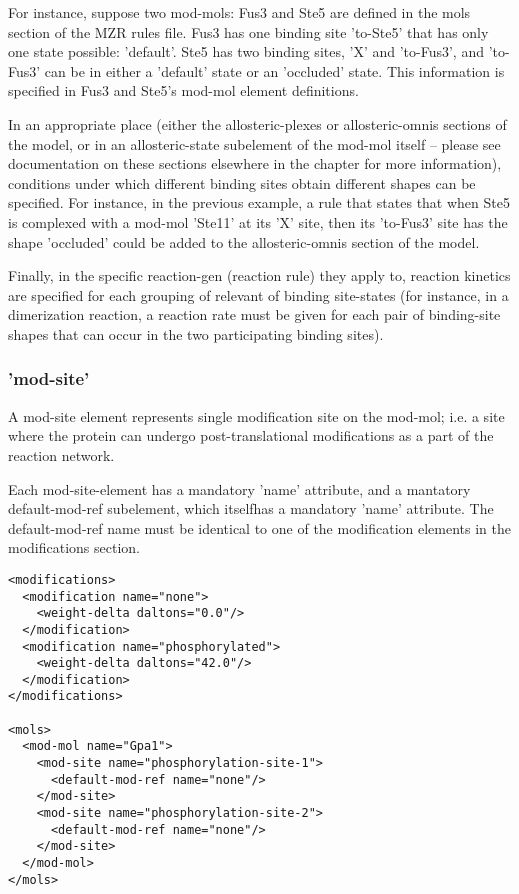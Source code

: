 For instance, suppose two mod-mols: Fus3 and Ste5 are defined in the
mols section of the MZR rules file.  Fus3 has one binding site
'to-Ste5' that has only one state possible: 'default'.  Ste5 has two
binding sites, 'X' and 'to-Fus3', and 'to-Fus3' can be in either a
'default' state or an 'occluded' state.  This information is specified
in Fus3 and Ste5's mod-mol element definitions.

In an appropriate place (either the allosteric-plexes or
allosteric-omnis sections of the model, or in an allosteric-state
subelement of the mod-mol itself -- please see documentation on these
sections elsewhere in the chapter for more information), conditions
under which different binding sites obtain different shapes can be
specified.  For instance, in the previous example, a rule that states
that when Ste5 is complexed with a mod-mol 'Ste11' at its 'X' site,
then its 'to-Fus3' site has the shape 'occluded' could be added to the
allosteric-omnis section of the model.

Finally, in the specific reaction-gen (reaction rule) they apply to,
reaction kinetics are specified for each grouping of relevant of
binding site-states (for instance, in a dimerization reaction, a
reaction rate must be given for each pair of binding-site shapes that
can occur in the two participating binding sites).  

\subsubsection{'mod-site'}
A mod-site element represents single modification site on the mod-mol;
i.e. a site where the protein can undergo post-translational 
modifications as a part of the reaction network.  

Each mod-site-element has a mandatory 'name' attribute, and a
mantatory default-mod-ref subelement, which itselfhas a mandatory 'name' attribute.
The default-mod-ref name must be identical to one of the modification elements in
the modifications section.

\lstset{language=XML}
\begin{lstlisting}[caption=Defining a modification site in a mod-mol, label=modsiteexample]
<modifications>
  <modification name="none">
    <weight-delta daltons="0.0"/>
  </modification>
  <modification name="phosphorylated">
    <weight-delta daltons="42.0"/>
  </modification>
</modifications>

<mols>
  <mod-mol name="Gpa1">
    <mod-site name="phosphorylation-site-1">
      <default-mod-ref name="none"/>
    </mod-site>
    <mod-site name="phosphorylation-site-2">
      <default-mod-ref name="none"/>
    </mod-site>
  </mod-mol>
</mols>
\end{lstlisting}

